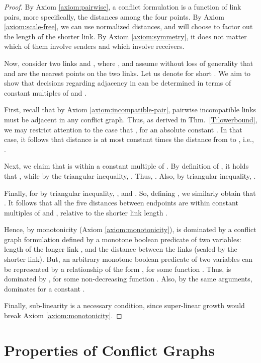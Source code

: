 \documentclass[11pt]{article}
\begin{document}
\begin{proof}
By Axiom \ref{axiom:pairwise}, a conflict formulation  is a function of link pairs, more specifically, the
distances among the four points. By Axiom \ref{axiom:scale-free}, we can use normalized distances, and will 
choose to factor out the length of the shorter link.
By Axiom \ref{axiom:symmetry}, it does not matter which of them involve senders and which involve receivers.

Now, consider two links  and , where , and
assume without loss of generality that  and  are the nearest points on the two links.
Let us denote for short .
We aim to show that decisions regarding adjacency in 
can be determined in terms of constant multiples of  and .

First, recall that by Axiom \ref{axiom:incompatible-pair}, pairwise incompatible links must be adjacent in any conflict
graph.  Thus, as derived in Thm.~\ref{T:lowerbound}, we may restrict attention to the case that , for
an absolute constant .  In that case, it follows that distance  is at most constant times the distance
from  to , i.e., .

Next, we claim that  is within a constant multiple of .
By definition of , it holds that , while by the triangular inequality,
. Thus, .
Also, by triangular inequality, . 

Finally, for by triangular inequality, ,
and . So, defining ,
we similarly obtain that .
It follows that all the five distances between endpoints are within constant multiples of  and ,
relative to the shorter link length .

Hence, by monotonicity (Axiom \ref{axiom:monotonicity}),  is dominated by a conflict graph
formulation  defined by a monotone boolean predicate of two variables: length of the longer link
, and the distance  between the links (scaled by the shorter link). 
But, an arbitrary monotone boolean predicate of two variables  can be represented by a 
relationship of the form , for some function . 
Thus,  is dominated by , for some non-decreasing function .
Also, by the same arguments,  dominates  for a constant .

Finally, sub-linearity is a necessary condition, since super-linear growth would break Axiom \ref{axiom:monotonicity}. 
\end{proof}



\section{Properties of Conflict Graphs}\label{S:graphproperties}
\end{document}
